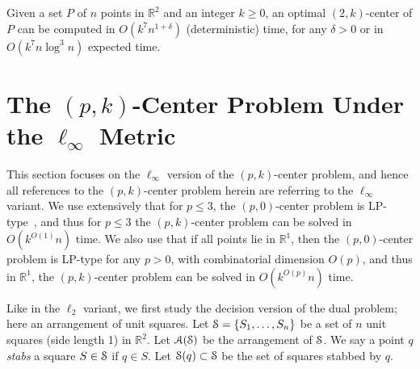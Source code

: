 \documentclass[11pt]{myclass}
\renewcommand{\b}[1]{\ensuremath{\mathbb{#1}}}
\newcommand{\EuA}{\ensuremath{\EuScript{A}}}
\newcommand{\EuS}{\ensuremath{\EuScript{S}}}
\begin{document}
\begin{theorem}
Given a set $P$ of $n$ points in $\b{R}^2$ and an integer $k \geq 0$, an optimal $(2,k)$-center of $P$ can be computed in $O(k^7 n^{1+\delta})$ (deterministic) time, for any $\delta>0$ 
or in $O(k^7 n \log^3 n)$ expected time.
\end{theorem}













































\section{The $(p,k)$-Center Problem Under the $\ell_\infty$ Metric}

This section focuses on the $\ell_\infty$ version of the $(p,k)$-center problem, and hence all references to the $(p,k)$-center problem herein are referring to the $\ell_\infty$ variant.  We use extensively that for $p \leq 3$, the $(p,0)$-center problem is LP-type~\cite{SW96}, and thus for $p\leq 3$ the $(p,k)$-center problem can be solved in $O(k^{O(1)} n)$ time.  We also use that if all points lie in $\b{R}^1$, then the $(p,0)$-center problem is LP-type for any $p>0$, with combinatorial dimension $O(p)$, and thus in $\b{R}^1$, the $(p,k)$-center problem can be solved in $O(k^{O(p)}n)$ time.  

Like in the $\ell_2$ variant, we first study the decision version of the dual problem; here an arrangement of unit squares.  
Let $\EuS = \{S_1, \ldots, S_n\}$ be a set of $n$ unit squares (side length 1) in $\b{R}^2$.  Let $\EuA(\EuS)$ be the arrangement of $\EuS$.  We say a point $q$ \emph{stabs} a square $S \in \EuS$ if $q \in S$.  Let $\EuS(q) \subset \EuS$ be the set of squares stabbed by $q$.  
\end{document}
